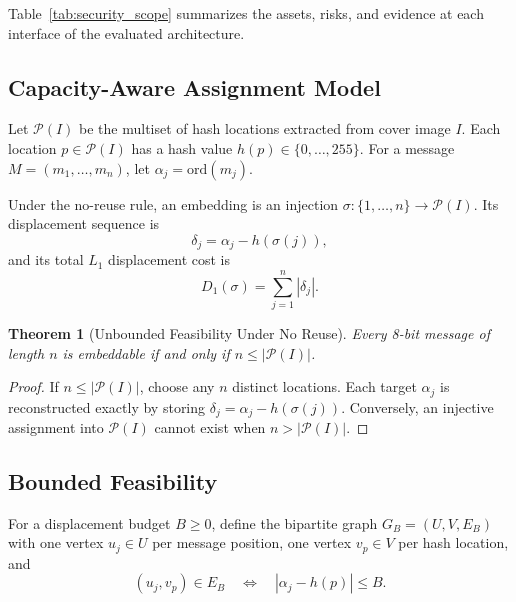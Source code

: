 \documentclass[preprint,12pt]{elsarticle}
\theoremstyle{plain}
\newtheorem{theorem}{Theorem}
\begin{document}
Table~\ref{tab:security_scope} summarizes the assets, risks, and evidence at
each interface of the evaluated architecture.
\begin{table}[!t]
\centering
\footnotesize
\renewcommand{\arraystretch}{0.92}
\setlength{\tabcolsep}{3pt}
\caption{Security scope and evidence for the FHAM communication architecture.}
\label{tab:security_scope}

\end{table}

\subsection{Capacity-Aware Assignment Model}

Let $\mathcal{P}(I)$ be the multiset of hash locations extracted from cover
image $I$. Each location $p\in\mathcal{P}(I)$ has a hash value
$h(p)\in\{0,\ldots,255\}$. For a message
$M=(m_1,\ldots,m_n)$, let $\alpha_j=\mathrm{ord}(m_j)$.

Under the no-reuse rule, an embedding is an injection
$\sigma:\{1,\ldots,n\}\rightarrow\mathcal{P}(I)$. Its displacement sequence is
\begin{equation}
    \delta_j=\alpha_j-h(\sigma(j)),
\end{equation}
and its total $L_1$ displacement cost is
\begin{equation}
    D_1(\sigma)=\sum_{j=1}^{n}|\delta_j|.
\end{equation}

\begin{theorem}[Unbounded Feasibility Under No Reuse]
\label{thm:feasibility}
Every 8-bit message of length $n$ is embeddable if and only if
$n\leq|\mathcal{P}(I)|$.
\end{theorem}
\begin{proof}
If $n\leq|\mathcal{P}(I)|$, choose any $n$ distinct locations. Each target
$\alpha_j$ is reconstructed exactly by storing
$\delta_j=\alpha_j-h(\sigma(j))$. Conversely, an injective assignment into
$\mathcal{P}(I)$ cannot exist when $n>|\mathcal{P}(I)|$.
\end{proof}

\subsection{Bounded Feasibility}

For a displacement budget $B\geq0$, define the bipartite graph
$G_B=(U,V,E_B)$ with one vertex $u_j\in U$ per message position, one vertex
$v_p\in V$ per hash location, and
\begin{equation}
    (u_j,v_p)\in E_B \quad\Longleftrightarrow\quad
    |\alpha_j-h(p)|\leq B.
\end{equation}
\end{document}

